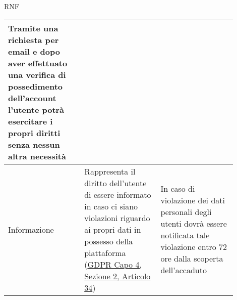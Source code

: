 \begin{listaPersonale}{RNF}
\begin{tabular}{|p{0.3\linewidth}|p{0.3\linewidth}|p{0.3\linewidth}|}
        Tramite una richiesta per email e dopo aver effettuato una verifica di
        possedimento dell'account l'utente potrà esercitare
        i propri diritti senza nessun altra necessità                        \\
        \hline
        Informazione                                         &
        Rappresenta il diritto dell'utente di essere informato in caso ci
        siano violazioni riguardo ai propri dati in possesso della piattaforma
        (\href{https://eur-lex.europa.eu/legal-content/IT/TXT/?uri=uriserv:OJ.L_.2016.119.01.0001.01.ITA&toc=OJ:L:2016:119:TOC#d1e3497-1-1}{GDPR Capo 4, Sezione 2, Articolo 34})                &
        In caso di violazione dei dati personali degli utenti dovrà essere
        notificata tale violazione entro 72 ore dalla scoperta dell'accaduto \\
        \hline
    \end{tabular}


\end{listaPersonale}
